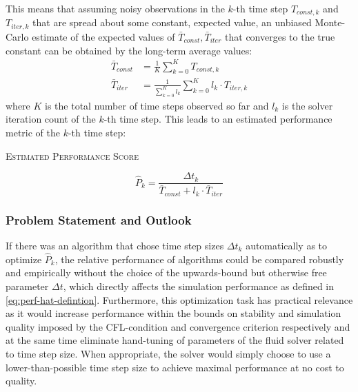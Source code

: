 \documentclass[oneside, a4paper]{book}
\newcommand{\equationnamed}[2]{%
  \setlength{\fboxsep}{2pt} %
  \setlength{\fboxrule}{0.01pt}
  \begin{center}
    \begin{minipage}{\textwidth}
      \begin{center}\textsc{#1}\end{center}
      #2
    \end{minipage}
  \end{center}
}
\begin{document}
    This means that assuming noisy observations in the $k$-th time step $T_{const,k}$ and $T_{iter,k}$ that are spread about some constant, expected value, an unbiased Monte-Carlo estimate of the expected values of $\bar{T}_{const}, \bar{T}_{iter}$ that converges to the true constant can be obtained by the long-term average values:
    \begin{align}
      \bar{T}_{const} &= \frac{1}{K}\sum_{k=0}^K T_{const,k}\\
      \bar{T}_{iter} &= \frac{1}{\sum_{k=0}^K l_k}\sum_{k=0}^K  l_k \cdot T_{iter,k}
    \end{align}
    where $K$ is the total number of time steps observed so far and $l_k$ is the solver iteration count of the $k$-th time step. This leads to an estimated performance metric of the $k$-th time step:
    \equationnamed{Estimated Performance Score}{
      \begin{equation}\label{eq:perf-hat-defintion}
        \hat{P}_k = \frac{\Delta t_k}{\bar{T}_{const} + l_k \cdot \bar{T}_{iter}}
      \end{equation}
    }
    
    \subsubsection{Problem Statement and Outlook}

    If there was an algorithm that chose time step sizes $\Delta t_k$ automatically as to optimize $\hat{P}_k$, the relative performance of algorithms could be compared robustly and empirically without the choice of the upwards-bound but otherwise free parameter $\Delta t$, which directly affects the simulation performance as defined in \autoref{eq:perf-hat-defintion}. Furthermore, this optimization task has practical relevance as it would increase performance within the bounds on stability and simulation quality imposed by the CFL-condition and convergence criterion respectively and at the same time eliminate hand-tuning of parameters of the fluid solver related to time step size. When appropriate, the solver would simply choose to use a lower-than-possible time step size to achieve maximal performance at no cost to quality. 
\end{document}
